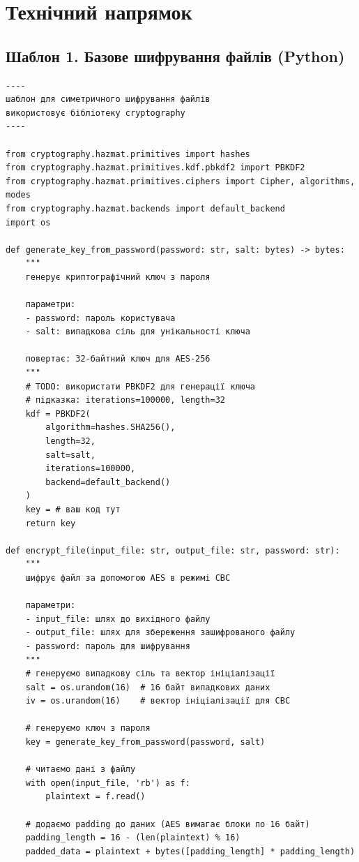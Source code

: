 \newpage
\section*{\centering Технічний напрямок}

\subsection*{Шаблон 1. Базове шифрування файлів (Python)}

\begin{lstlisting}[caption={Шаблон для симетричного шифрування файлів}]
----
шаблон для симетричного шифрування файлів
використовує бібліотеку cryptography
----

from cryptography.hazmat.primitives import hashes
from cryptography.hazmat.primitives.kdf.pbkdf2 import PBKDF2
from cryptography.hazmat.primitives.ciphers import Cipher, algorithms, modes
from cryptography.hazmat.backends import default_backend
import os

def generate_key_from_password(password: str, salt: bytes) -> bytes:
    """
    генерує криптографічний ключ з пароля
    
    параметри:
    - password: пароль користувача
    - salt: випадкова сіль для унікальності ключа
    
    повертає: 32-байтний ключ для AES-256
    """
    # TODO: використати PBKDF2 для генерації ключа
    # підказка: iterations=100000, length=32
    kdf = PBKDF2(
        algorithm=hashes.SHA256(),
        length=32,
        salt=salt,
        iterations=100000,
        backend=default_backend()
    )
    key = # ваш код тут
    return key

def encrypt_file(input_file: str, output_file: str, password: str):
    """
    шифрує файл за допомогою AES в режимі CBC
    
    параметри:
    - input_file: шлях до вихідного файлу
    - output_file: шлях для збереження зашифрованого файлу
    - password: пароль для шифрування
    """
    # генеруємо випадкову сіль та вектор ініціалізації
    salt = os.urandom(16)  # 16 байт випадкових даних
    iv = os.urandom(16)    # вектор ініціалізації для CBC
    
    # генеруємо ключ з пароля
    key = generate_key_from_password(password, salt)
    
    # читаємо дані з файлу
    with open(input_file, 'rb') as f:
        plaintext = f.read()
    
    # додаємо padding до даних (AES вимагає блоки по 16 байт)
    padding_length = 16 - (len(plaintext) % 16)
    padded_data = plaintext + bytes([padding_length] * padding_length)
    

\end{lstlisting}
